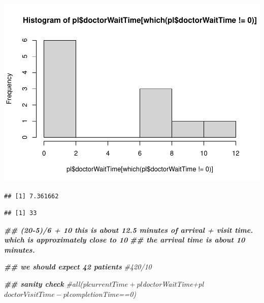 \documentclass[
]{book}
\newenvironment{Shaded}{\begin{snugshade}}{\end{snugshade}}
\newcommand{\CommentTok}[1]{\textcolor[rgb]{0.56,0.35,0.01}{\textit{#1}}}
\newcommand{\DecValTok}[1]{\textcolor[rgb]{0.00,0.00,0.81}{#1}}
\newcommand{\DocumentationTok}[1]{\textcolor[rgb]{0.56,0.35,0.01}{\textbf{\textit{#1}}}}
\newcommand{\FunctionTok}[1]{\textcolor[rgb]{0.00,0.00,0.00}{#1}}
\newcommand{\NormalTok}[1]{#1}
\newcommand{\SpecialCharTok}[1]{\textcolor[rgb]{0.00,0.00,0.00}{#1}}
\theoremstyle{definition}
\theoremstyle{definition}
\theoremstyle{definition}
\theoremstyle{definition}
\theoremstyle{remark}
\begin{document}
\includegraphics{_main_files/figure-latex/unnamed-chunk-9-3.pdf}

\begin{Shaded}
\end{Shaded}

\begin{verbatim}
## [1] 7.361662
\end{verbatim}

\begin{Shaded}
\end{Shaded}

\begin{verbatim}
## [1] 33
\end{verbatim}

\begin{Shaded}
\begin{Highlighting}[]
\DocumentationTok{\#\# (20{-}5)/6 + 10 this is about 12.5 minutes of arrival + visit time. which is approximately close to 10 }
\DocumentationTok{\#\# the arrival time is about 10 minutes.  }

\DocumentationTok{\#\# we should expect 42 patients}
 \CommentTok{\#420/10}
  
  \DocumentationTok{\#\# sanity check}
  \CommentTok{\#all(pl$currentTime+pl$doctorWaitTime+pl$doctorVisitTime{-}pl$completionTime==0)}
\end{Highlighting}
\end{Shaded}
\end{document}
